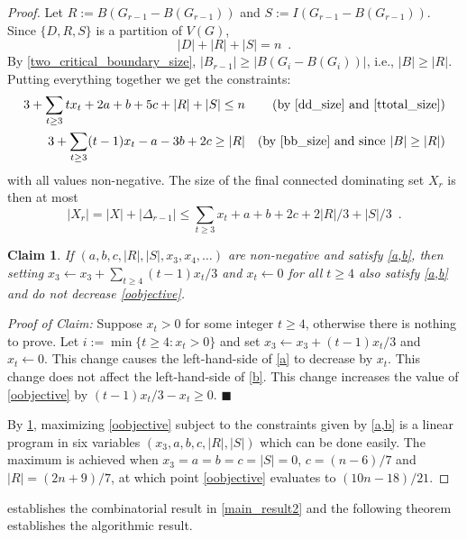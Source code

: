 \documentclass[a4paper,UKenglish, cleveref, autoref, thm-restate]{lipics-v2021}
\newtheorem{clm}{Claim}
\newenvironment{clmproof}{\noindent\emph{Proof of Claim:}}{\hfill{$\blacksquare$}\par}
\begin{document}
\begin{proof}
  Let $R:=B(G_{r-1}-B(G_{r-1}))$ and $S:=I(G_{r-1}-B(G_{r-1}))$.  Since $\{D,R,S\}$ is a partition of $V(G)$,
  \begin{equation}
    |D|+|R|+|S|= n \enspace . \label{ttotal_size}
  \end{equation}
  By \cref{two_critical_boundary_size}, $|B_{r-1}|\ge |B(G_i-B(G_i))|$, i.e., $|B|\ge |R|$.  Putting everything together we get the constraints:
  \begin{align}
        3 + \sum_{t\ge 3}tx_t + 2a + b + 5c + |R| + |S| \le n&
          & \text{(by \cref{dd_size} and \cref{ttotal_size})}  \label{a} \\
        3 + \sum_{t\ge 3}(t-1)x_t - a - 3b + 2c \ge |R|
          & & \text{(by \cref{bb_size} and since $|B|\ge |R|$)} \label{b}
  \end{align}
  with all values non-negative.  The size of the final connected dominating set $X_r$ is then at most
  \begin{equation}
    |X_r| = |X| + |\Delta_{r-1}| \le \sum_{t\ge 3}x_t + a + b + 2c + 2|R|/3 + |S|/3  \enspace . \label{oobjective}
  \end{equation}

  \begin{clm}\label{simplify}
    If $(a,b,c,|R|,|S|,x_3,x_4,\ldots)$ are non-negative and satisfy \cref{a,b}, then setting $x_3\gets x_3+\sum_{t\ge 4}(t-1)x_t/3$ and $x_t\gets 0$ for all $t\ge 4$ also satisfy \cref{a,b} and do not decrease \cref{oobjective}.
  \end{clm}

  \begin{clmproof}
    Suppose $x_t>0$ for some integer $t\ge 4$, otherwise there is nothing to prove.  Let $i:=\min\{t\ge 4: x_t>0\}$ and set $x_3\gets x_3+(t-1)x_t/3$ and $x_t\gets 0$. This change causes the left-hand-side of \cref{a} to decrease by $x_t$. This change does not affect the left-hand-side of \cref{b}.  This change increases the value of \cref{oobjective} by $(t-1)x_t/3-x_t\ge 0$.
  \end{clmproof}

  By \cref{simplify}, maximizing \cref{oobjective} subject to the constraints given by \cref{a,b} is a linear program in six variables $(x_3,a,b,c,|R|,|S|)$ which can be done easily.  The maximum is achieved when $x_3=a=b=c=|S|=0$, $c=(n-6)/7$ and $|R|=(2n+9)/7$, at which point \cref{oobjective} evaluates to $(10n-18)/21$.
\end{proof}

 establishes the combinatorial result in \cref{main_result2} and the following theorem establishes the algorithmic result.
\end{document}
